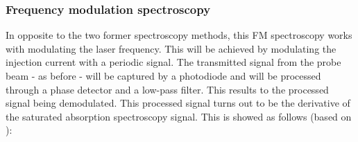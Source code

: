 \subsubsection{Frequency modulation spectroscopy}
In opposite to the two former spectroscopy methods, this FM spectroscopy works with modulating the laser frequency. This will be achieved by modulating the injection current with a periodic signal. The transmitted signal from the probe beam - as before - will be captured by a photodiode and will be processed through a phase detector and a low-pass filter. This results to the processed signal being demodulated. This processed signal turns out to be the derivative of the saturated absorption spectroscopy signal. This is showed as follows (based on \cite{lit:mpi_FM_spec}):
